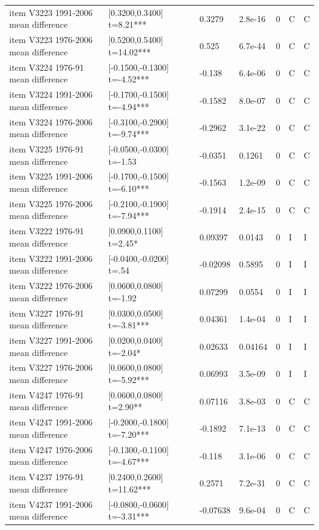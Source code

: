 {\begin{longtable}{@{}p{.245\linewidth}p{.17\linewidth}p{.17\linewidth}p{.085\linewidth}p{.060\linewidth}p{.08\linewidth}p{.07\linewidth}@{}}
item V3223 1991-2006 mean difference & [0.3200,0.3400] t=8.21*** & 0.3279 & 2.8e-16 & 0 & C & C\\
item V3223 1976-2006 mean difference & [0.5200,0.5400] t=14.02*** & 0.525 & 6.7e-44 & 0 & C & C\\
item V3224 1976-91 mean difference & [-0.1500,-0.1300] t=-4.52*** & -0.138 & 6.4e-06 & 0 & C & C\\
item V3224 1991-2006 mean difference & [-0.1700,-0.1500] t=-4.94*** & -0.1582 & 8.0e-07 & 0 & C & C\\
item V3224 1976-2006 mean difference & [-0.3100,-0.2900] t=-9.74*** & -0.2962 & 3.1e-22 & 0 & C & C\\
item V3225 1976-91 mean difference & [-0.0500,-0.0300] t=-1.53 & -0.0351 & 0.1261 & 0 & C & C\\
item V3225 1991-2006 mean difference & [-0.1700,-0.1500] t=-6.10*** & -0.1563 & 1.2e-09 & 0 & C & C\\
item V3225 1976-2006 mean difference & [-0.2100,-0.1900] t=-7.94*** & -0.1914 & 2.4e-15 & 0 & C & C\\
item V3222 1976-91 mean difference & [0.0900,0.1100] t=2.45* & 0.09397 & 0.0143 & 0 & I & I\\
item V3222 1991-2006 mean difference & [-0.0400,-0.0200] t=.54 & -0.02098 & 0.5895 & 0 & I & I\\
item V3222 1976-2006 mean difference & [0.0600,0.0800] t=-1.92 & 0.07299 & 0.0554 & 0 & I & I\\
item V3227 1976-91 mean difference & [0.0300,0.0500] t=-3.81*** & 0.04361 & 1.4e-04 & 0 & I & I\\
item V3227 1991-2006 mean difference & [0.0200,0.0400] t=-2.04* & 0.02633 & 0.04164 & 0 & I & I\\
item V3227 1976-2006 mean difference & [0.0600,0.0800] t=-5.92*** & 0.06993 & 3.5e-09 & 0 & I & I\\
item V4247 1976-91 mean difference & [0.0600,0.0800] t=2.90** & 0.07116 & 3.8e-03 & 0 & C & C\\
item V4247 1991-2006 mean difference & [-0.2000,-0.1800] t=-7.20*** & -0.1892 & 7.1e-13 & 0 & C & C\\
item V4247 1976-2006 mean difference & [-0.1300,-0.1100] t=-4.67*** & -0.118 & 3.1e-06 & 0 & C & C\\
item V4237 1976-91 mean difference & [0.2400,0.2600] t=11.62*** & 0.2571 & 7.2e-31 & 0 & C & C\\
item V4237 1991-2006 mean difference & [-0.0800,-0.0600] t=-3.31*** & -0.07638 & 9.6e-04 & 0 & C & C\\

\end{longtable}}
